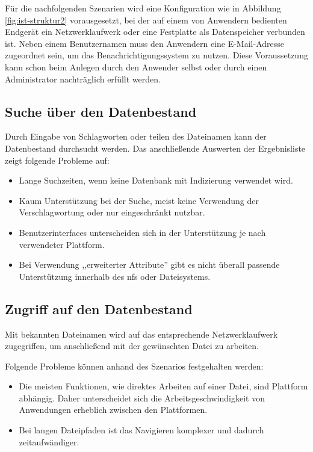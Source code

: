 \documentclass[oneside, ngerman, toc=bibliography,bibliography=totoc,listof=entryprefix, open=right,numbers=noenddot,fontsize=12pt]{scrbook}
\begin{document}
Für die nachfolgenden Szenarien wird eine Konfiguration wie in Abbildung \ref{fig:ist-struktur2} vorausgesetzt, bei der auf einem von Anwendern bedienten Endgerät ein Netzwerklaufwerk oder eine Festplatte als Datenspeicher verbunden ist. Neben einem Benutzernamen muss den Anwendern eine E-Mail-Adresse zugeordnet sein, um das Benachrichtigungssystem zu nutzen. Diese Voraussetzung kann schon beim Anlegen durch den Anwender selbst oder durch einen Administrator nachträglich erfüllt werden.


\subsection*{Suche über den Datenbestand}
Durch Eingabe von Schlagworten oder teilen des Dateinamen kann der Datenbestand durchsucht werden. Das anschließende Auswerten der Ergebnisliste zeigt folgende Probleme auf:

\begin{itemize}
	\item Lange Suchzeiten, wenn keine Datenbank mit Indizierung verwendet wird.
	\item Kaum Unterstützung bei der Suche, meist keine Verwendung der Verschlagwortung oder nur eingeschränkt nutzbar. 
	\item Benutzerinterfaces unterscheiden sich in der Unterstützung je nach verwendeter Plattform.
	\item Bei Verwendung ,,erweiterter Attribute'' gibt es nicht überall passende Unterstützung innerhalb des \acrshort{nfs} oder Dateisystems.
\end{itemize}

\subsection*{Zugriff auf den Datenbestand}
Mit bekannten Dateinamen wird auf das entsprechende Netzwerklaufwerk zugegriffen, um anschließend mit der gewünschten Datei zu arbeiten.

\bigskip
Folgende Probleme können anhand des Szenarios festgehalten werden:
\begin{itemize}
	\item Die meisten Funktionen, wie direktes Arbeiten auf einer Datei, sind Plattform abhängig. Daher unterscheidet sich die Arbeitsgeschwindigkeit von Anwendungen erheblich zwischen den Plattformen.
	\item Bei langen Dateipfaden ist das Navigieren komplexer und dadurch zeitaufwändiger.
\end{itemize}
\end{document}
